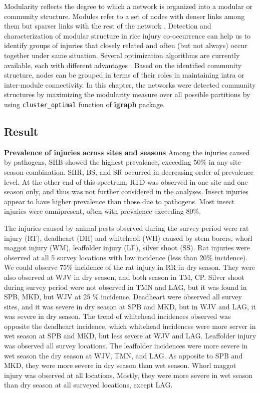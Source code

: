 Modularity reflects the degree to which a network is organized into a modular or community structure. Modules refer to a set of nodes with denser links among them but sparser links with the rest of the network \citep{Newman_2006_Modularity}. Detection and characterization of modular structure in rice injury co-occurrence can help us to identify groups of injuries that closely related and often (but not always) occur together under same situation. Several optimization algorithms are currently available, each with different advantages \citep{Brandes_2008_Modularity}. Based on the identified community structure, nodes can be grouped in terms of their roles in maintaining intra or inter-module connectivity. In this chapter, the networks were detected community structures by maximizing the modularity measure over all possible partitions by using \texttt{cluster\_optimal} function of \textbf{igraph} package.

\subsection{Result}

\textbf{Prevalence of injuries across sites and seasons}
Among the injuries caused by pathogens, SHB showed the highest prevalence, exceeding 50\% in any site–season combination. SHR, BS, and SR occurred in decreasing order of prevalence level. At the other end of this spectrum, RTD was observed in one site and one season only, and thus was not further considered in the analyses. Insect injuries appear to have higher prevalence than those due to pathogens. Most insect injuries were omnipresent, often with prevalence exceeding 80\%.

The injuries caused by animal pests observed during the survey period were rat injury (RT), deadheart (DH) and whitehead (WH) caused by stem borers, whorl maggot injury (WM), leaffolder injury (LF), silver shoot (SS). Rat injuries were observed at all 5 survey locations with low incidence (less than 20\% incidence). We could observe 75\% incidence of the rat injury in RR in dry season. They were also observed at WJV in dry season, and both season in TM, CP. Silver shoot during survey period were not observed in TMN and LAG, but it was found in SPB, MKD, but WJV at 25 \% incidence. Deadheart were observed all survey sites, and it was severe in dry season at SPB and MKD, but in WJV and LAG, it was severe in dry season. The trend of whitehead incidences observed was opposite the deadheart incidence, which whitehead incidences were more server in wet season at SPB and MKD, but less severe at WJV and LAG. Leaffolder injury was observed all survey locations. The leaffolder incidences were more severe in wet season the dry season at WJV, TMN, and LAG. As apposite to SPB and MKD, they were more severe in dry season than wet season. Whorl maggot injury was observed at all locations. Mostly, they were more severe in wet season than dry season at all surveyed locations, except LAG.

